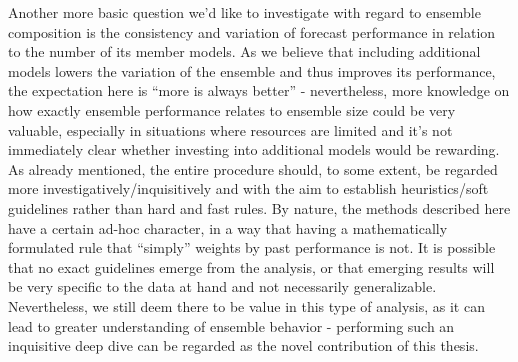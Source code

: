 Another more basic question we'd like to investigate with regard to ensemble composition is the consistency and variation of forecast performance in relation to the number of its member models. As we believe that including additional models lowers the variation of the ensemble and thus improves its performance, the expectation here is ``more is always better'' - nevertheless, more knowledge on how exactly ensemble performance relates to ensemble size could be very valuable, especially in situations where resources are limited and it's not immediately clear whether investing into additional models would be rewarding.\\ %
As already mentioned, the entire procedure should, to some extent, be regarded more investigatively/inquisitively and with the aim to establish heuristics/soft guidelines rather than hard and fast rules. By nature, the methods described here have a certain ad-hoc character, in a way that having a mathematically formulated rule that ``simply'' weights by past performance is not. It is possible that no exact guidelines emerge from the analysis, or that emerging results will be very specific to the data at hand and not necessarily generalizable. Nevertheless, we still deem there to be value in this type of analysis, as it can lead to greater understanding of ensemble behavior - performing such an inquisitive deep dive can be regarded as the novel contribution of this thesis.\\

